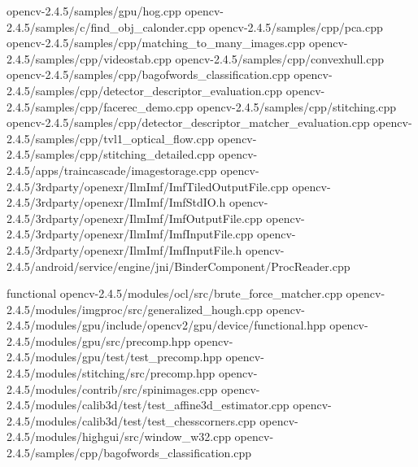 \documentclass[10pt,a4paper]{article}
\begin{document}
opencv-2.4.5/samples/gpu/hog.cpp \newline
opencv-2.4.5/samples/c/find\_obj\_calonder.cpp \newline
opencv-2.4.5/samples/cpp/pca.cpp \newline
opencv-2.4.5/samples/cpp/matching\_to\_many\_images.cpp \newline
opencv-2.4.5/samples/cpp/videostab.cpp \newline
opencv-2.4.5/samples/cpp/convexhull.cpp \newline
opencv-2.4.5/samples/cpp/bagofwords\_classification.cpp \newline
opencv-2.4.5/samples/cpp/detector\_descriptor\_evaluation.cpp \newline
opencv-2.4.5/samples/cpp/facerec\_demo.cpp \newline
opencv-2.4.5/samples/cpp/stitching.cpp \newline
opencv-2.4.5/samples/cpp/detector\_descriptor\_matcher\_evaluation.cpp \newline
opencv-2.4.5/samples/cpp/tvl1\_optical\_flow.cpp \newline
opencv-2.4.5/samples/cpp/stitching\_detailed.cpp \newline
opencv-2.4.5/apps/traincascade/imagestorage.cpp \newline
opencv-2.4.5/3rdparty/openexr/IlmImf/ImfTiledOutputFile.cpp \newline
opencv-2.4.5/3rdparty/openexr/IlmImf/ImfStdIO.h \newline
opencv-2.4.5/3rdparty/openexr/IlmImf/ImfOutputFile.cpp \newline
opencv-2.4.5/3rdparty/openexr/IlmImf/ImfInputFile.cpp \newline
opencv-2.4.5/3rdparty/openexr/IlmImf/ImfInputFile.h \newline
opencv-2.4.5/android/service/engine/jni/BinderComponent/ProcReader.cpp \newline

functional \newline
opencv-2.4.5/modules/ocl/src/brute\_force\_matcher.cpp \newline
opencv-2.4.5/modules/imgproc/src/generalized\_hough.cpp \newline
opencv-2.4.5/modules/gpu/include/opencv2/gpu/device/functional.hpp \newline
opencv-2.4.5/modules/gpu/src/precomp.hpp \newline
opencv-2.4.5/modules/gpu/test/test\_precomp.hpp \newline
opencv-2.4.5/modules/stitching/src/precomp.hpp \newline
opencv-2.4.5/modules/contrib/src/spinimages.cpp \newline
opencv-2.4.5/modules/calib3d/test/test\_affine3d\_estimator.cpp \newline
opencv-2.4.5/modules/calib3d/test/test\_chesscorners.cpp \newline
opencv-2.4.5/modules/highgui/src/window\_w32.cpp \newline
opencv-2.4.5/samples/cpp/bagofwords\_classification.cpp \\
\end{document}
